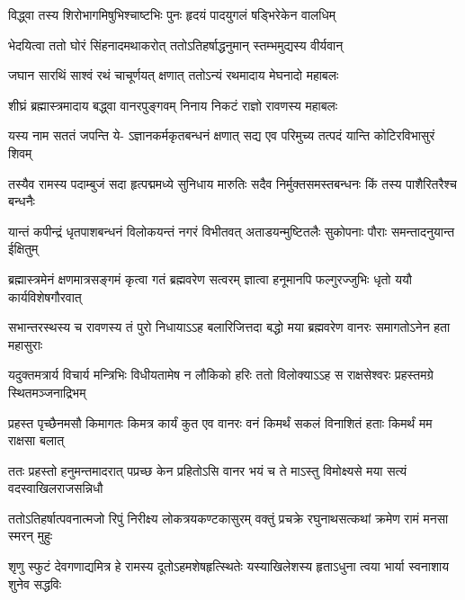 \twolineshloka
{विद्ध्वा तस्य शिरोभागमिषुभिश्चाष्टभिः पुनः}
{हृदयं पादयुगलं षड्भिरेकेन वालधिम्} %

\twolineshloka
{भेदयित्वा ततो घोरं सिंहनादमथाकरोत्}
{ततोऽतिहर्षाद्धनुमान् स्तम्भमुद्यस्य वीर्यवान्} %

\twolineshloka
{जघान सारथिं साश्वं रथं चाचूर्णयत् क्षणात्}
{ततोऽन्यं रथमादाय मेघनादो महाबलः} %

\twolineshloka
{शीघ्रं ब्रह्मास्त्रमादाय बद्\mbox{}ध्वा वानरपुङ्गवम्}
{निनाय निकटं राज्ञो रावणस्य महाबलः} %

\fourlineindentedshloka
{यस्य नाम सततं जपन्ति ये-}
{ऽज्ञानकर्मकृतबन्धनं क्षणात्}
{सद्य एव परिमुच्य तत्पदं}
{यान्ति कोटिरविभासुरं शिवम्} %

\fourlineindentedshloka
{तस्यैव रामस्य पदाम्बुजं सदा}
{हृत्पद्ममध्ये सुनिधाय मारुतिः}
{सदैव निर्मुक्तसमस्तबन्धनः}
{किं तस्य पाशैरितरैश्च बन्धनैः} %






\fourlineindentedshloka
{यान्तं कपीन्द्रं धृतपाशबन्धनं}
{विलोकयन्तं नगरं विभीतवत्}
{अताडयन्मुष्टितलैः सुकोपनाः}
{पौराः समन्तादनुयान्त ईक्षितुम्} %

\fourlineindentedshloka
{ब्रह्मास्त्रमेनं क्षणमात्रसङ्गमं}
{कृत्वा गतं ब्रह्मवरेण सत्वरम्}
{ज्ञात्वा हनूमानपि फल्गुरज्जुभिः}
{धृतो ययौ कार्यविशेषगौरवात्} %

\fourlineindentedshloka
{सभान्तरस्थस्य च रावणस्य तं}
{पुरो निधायाऽऽह बलारिजित्तदा}
{बद्धो मया ब्रह्मवरेण वानरः}
{समागतोऽनेन हता महासुराः} %

\fourlineindentedshloka
{यदुक्तमत्रार्य विचार्य मन्त्रिभिः}
{विधीयतामेष न लौकिको हरिः}
{ततो विलोक्याऽऽह स राक्षसेश्वरः}
{प्रहस्तमग्रे स्थितमञ्जनाद्रिभम्} %

\fourlineindentedshloka
{प्रहस्त पृच्छैनमसौ किमागतः}
{किमत्र कार्यं कुत एव वानरः}
{वनं किमर्थं सकलं विनाशितं}
{हताः किमर्थं मम राक्षसा बलात्} %

\fourlineindentedshloka
{ततः प्रहस्तो हनुमन्तमादरात्}
{पप्रच्छ केन प्रहितोऽसि वानर}
{भयं च ते माऽस्तु विमोक्ष्यसे मया}
{सत्यं वदस्वाखिलराजसन्निधौ} %

\fourlineindentedshloka
{ततोऽतिहर्षात्पवनात्मजो रिपुं}
{निरीक्ष्य लोकत्रयकण्टकासुरम्}
{वक्तुं प्रचक्रे रघुनाथसत्कथां}
{क्रमेण रामं मनसा स्मरन् मुहुः} %

\fourlineindentedshloka
{शृणु स्फुटं देवगणाद्यमित्र हे}
{रामस्य दूतोऽहमशेषहृत्स्थितेः}
{यस्याखिलेशस्य हृताऽधुना त्वया}
{भार्या स्वनाशाय शुनेव सद्धविः} %

